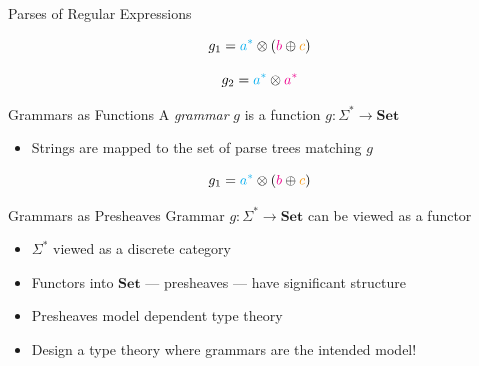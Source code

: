 \documentclass[10pt]{beamer}
\makeatletter
\newif\ifdraft
\newcommand{\todoin}[1]{\ifdraft{\todo[inline]{TODO:\@ #1}}\fi}
\newcommand{\Set}{\mathbf{Set}}
\makeatother
\begin{document}
\begin{frame}{Parses of Regular Expressions}
  \begin{minipage}{.5\textwidth}
  $$g_{1} = {\color{cyan} a^{*}} \otimes ({\color{magenta} b} \oplus {\color{YellowOrange} c})$$
  \end{minipage}%
  \begin{minipage}{.5\textwidth}
  $$g_{2} = {\color{cyan} a^{*}} \otimes {\color{magenta}a^{*}}$$
  \end{minipage}
  \todoin{layout slide, draw parse trees}
\end{frame}

\begin{frame}{Grammars as Functions}
  A \emph{grammar} $g$ is a function $g : \Sigma^{*} \to \Set$
  \begin{itemize}
    \item Strings are mapped to the set of parse trees matching $g$
  \end{itemize}

  \begin{minipage}{.5\textwidth}
  $$g_{1} = {\color{cyan} a^{*}} \otimes ({\color{magenta} b} \oplus {\color{YellowOrange} c})$$
  \end{minipage}
  \todoin{layout slide}
\end{frame}

\begin{frame}{Grammars as Presheaves}
  Grammar
  $g : \Sigma^{*} \to \Set$
  can be viewed as a functor

  \begin{itemize}
    \item<+-> $\Sigma^{*}$ viewed as a discrete category
    \item<+-> Functors into $\Set$ --- presheaves --- have significant structure
    \item<+-> Presheaves model dependent type theory
    \item<+-> Design a type theory where grammars are the intended model!
  \end{itemize}
\end{frame}
\end{document}
